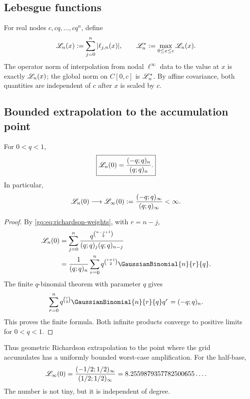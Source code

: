 \subsection{Lebesgue functions}

For real nodes $c,cq,\ldots,cq^n$, define
\begin{equation}
 \mathscr L_n(x):=\sum_{j=0}^n|\ell_{j,n}(x)|,
 \qquad
 \mathscr L_n^*:=\max_{0\le x\le c}\mathscr L_n(x).
 \label{gq:eq:lebesgue-definition}
\end{equation}
The operator norm of interpolation from nodal $\ell^\infty$ data to the
value at $x$ is exactly $\mathscr L_n(x)$; the global norm on $C[0,c]$ is
$\mathscr L_n^*$.  By affine covariance, both quantities are independent of $c$
after $x$ is scaled by $c$.

\subsection{Bounded extrapolation to the accumulation point}

\begin{theorem}
\label{gq:thm:endpoint-lebesgue}
For $0<q<1$,
\begin{equation}
 \boxed{
 \mathscr L_n(0)=\frac{(-q;q)_n}{(q;q)_n}.}
 \label{gq:eq:endpoint-lebesgue}
\end{equation}
In particular,
\begin{equation}
 \mathscr L_n(0)\longrightarrow
 \mathscr L_\infty(0):=\frac{(-q;q)_\infty}{(q;q)_\infty}<\infty.
 \label{gq:eq:endpoint-lebesgue-limit}
\end{equation}
\end{theorem}

\begin{proof}
By \eqref{gq:eq:richardson-weights}, with $r=n-j$,
\begin{align*}
 \Leb_n(0)
 &=\sum_{j=0}^n
   \frac{q^{\binom{n-j+1}{2}}}{(q;q)_j(q;q)_{n-j}}\\
 &=\frac1{(q;q)_n}\sum_{r=0}^n
   q^{\binom{r+1}{2}}\GaussianBinomial{n}{r}{q}.
\end{align*}
The finite $q$-binomial theorem with parameter $q$ gives
\[
 \sum_{r=0}^nq^{\binom r2}\GaussianBinomial{n}{r}{q}q^r=(-q;q)_n.
\]
This proves the finite formula.  Both infinite products converge to positive
limits for $0<q<1$.
\end{proof}

Thus geometric Richardson extrapolation to the point where the grid
accumulates has a uniformly bounded worst-case amplification.  For the
half-base,
\begin{equation}
 \mathscr L_\infty(0)
 =\frac{(-1/2;1/2)_\infty}{(1/2;1/2)_\infty}
 =8.2559879357782500655\ldots.
 \label{gq:eq:half-endpoint-constant}
\end{equation}
The number is not tiny, but it is independent of degree.

